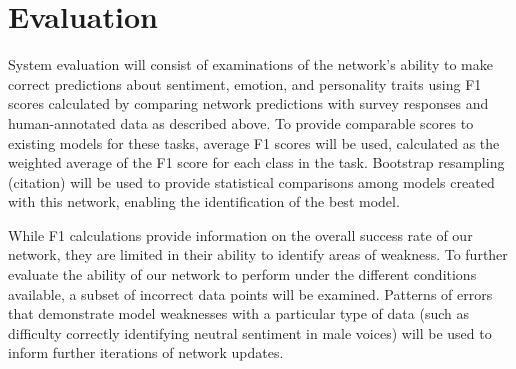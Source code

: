 \section{Evaluation}

System evaluation will consist of examinations of the network's ability to
make correct predictions about sentiment, emotion, and personality traits
using F1 scores calculated by comparing network predictions with survey
responses and human-annotated data as described above. To provide comparable
scores to existing models for these tasks, average F1 scores will be used,
calculated as the weighted average of the F1 score for each class in the task.
Bootstrap resampling (citation) will be used to provide statistical
comparisons among models created with this network, enabling the
identification of the best model. 

While F1 calculations provide information on the overall success rate of our
network, they are limited in their ability to identify areas of weakness. To
further evaluate the ability of our network to perform under the different
conditions available, a subset of incorrect data points will be examined.
Patterns of errors that demonstrate model weaknesses with a particular type of
data (such as difficulty correctly identifying neutral sentiment in male
voices) will be used to inform further iterations of network updates. 
